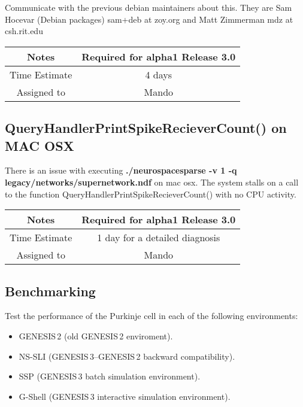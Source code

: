 \documentclass[12pt]{article}
\begin{document}
Communicate with the previous debian maintainers about this.  They are
Sam Hocevar (Debian packages) sam+deb at zoy.org and Matt Zimmerman
mdz at csh.rit.edu

{
  \vspace{5mm}
  \centering
  \begin{tabular}{|c|c|}
    \hline
    Notes
    & Required for alpha1 Release 3.0 \\
    \hline
    Time Estimate
    & 4 days \\
    \hline
    Assigned to
    & Mando \\
    \hline
  \end{tabular}
}



\subsection{QueryHandlerPrintSpikeRecieverCount() on MAC OSX}

There is an issue with executing {\bf ./neurospacesparse -v 1 -q
  legacy/networks/supernetwork.ndf} on mac osx. The system stalls on a
call to the function QueryHandlerPrintSpikeRecieverCount() with no CPU
activity.

{
  \vspace{5mm}
  \centering
  \begin{tabular}{|c|c|}
    \hline
    Notes
    & Required for alpha1 Release 3.0 \\
    \hline
    Time Estimate
    & 1 day for a detailed diagnosis \\
    \hline
    Assigned to
    & Mando \\
    \hline
  \end{tabular}
}



\subsection{Benchmarking}

Test the performance of the Purkinje cell in each of the following
environments:

\begin{itemize}
\item GENESIS\,2 (old GENESIS\,2 enviroment).
\item NS-SLI (GENESIS\,3--GENESIS\,2 backward compatibility).
\item SSP (GENESIS\,3 batch simulation environment).
\item G-Shell (GENESIS\,3 interactive simulation environment).
\end{itemize}
\end{document}
